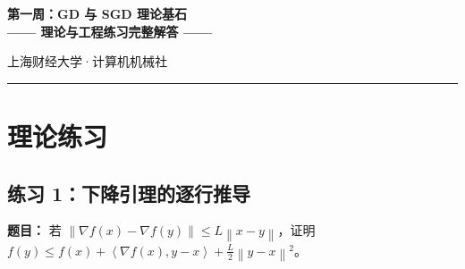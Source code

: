 \documentclass[12pt,a4paper]{ctexart}
\theoremstyle{definition}
\theoremstyle{plain}
\newcommand{\grad}{\nabla}
\newcommand{\norm}[1]{\left\lVert #1 \right\rVert}
\newcommand{\ip}[2]{\left\langle #1,#2 \right\rangle}
\begin{document}
\begin{center}
\Large\textbf{第一周：GD 与 SGD 理论基石}\\[4pt]
\textbf{—— 理论与工程练习完整解答 ——}

\vspace{0.5cm}
\normalsize 上海财经大学·计算机机械社
\end{center}

\vspace{0.3cm}
\rule{\textwidth}{0.5pt}

\section{理论练习}

\subsection{练习 1：下降引理的逐行推导}

\textbf{题目：} 若 $\norm{\grad f(x) - \grad f(y)} \le L\norm{x-y}$，证明
$f(y) \le f(x) + \ip{\grad f(x)}{y-x} + \frac{L}{2}\norm{y-x}^2$。
\end{document}
